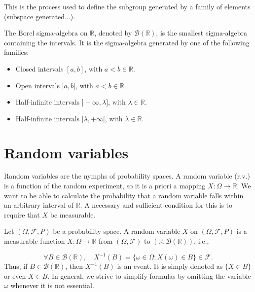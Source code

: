 \begin{remark}
This is the process used to define the subgroup generated by a family of elements (subspace generated...).
\end{remark}%
\begin{definition}
The Borel sigma-algebra on $\mathbb{R}$, denoted by $\mathcal{B}(\mathbb{R})$, is the smallest sigma-algebra containing the intervals. It is the sigma-algebra generated by one of the following families:
\begin{itemize}
    \item Closed intervals $[a, b]$, with $a < b \in \mathbb{R}$.
    \item Open intervals $]a, b[$, with $a < b \in \mathbb{R}$.
    \item Half-infinite intervals $]-\infty, \lambda]$, with $\lambda \in \mathbb{R}$.
    \item Half-infinite intervals $[\lambda, +\infty[$, with $\lambda \in \mathbb{R}$.
\end{itemize}
\end{definition}%
\section{Random variables}%

Random variables are the nymphs of probability spaces. A random variable (r.v.) is a function of the random experiment, so it is a priori a mapping $X : \Omega \to \mathbb{R}$. We want to be able to calculate the probability that a random variable falls within an arbitrary interval of $\mathbb{R}$. A necessary and sufficient condition for this is to require that $X$ be measurable.
\begin{definition}
Let $(\Omega, \mathcal{F}, P)$ be a probability space. A random variable $X$ on $(\Omega, \mathcal{F}, P)$ is a measurable function $X : \Omega \to \mathbb{R}$ from $(\Omega, \mathcal{F})$ to $(\mathbb{R}, \mathcal{B}(\mathbb{R}))$, i.e.,

\[ \forall B \in \mathcal{B}(\mathbb{R}), \quad X^{-1}(B) = \{\omega \in \Omega; X(\omega) \in B\} \in \mathcal{F}. \]
Thus, if $B \in \mathcal{B}(\mathbb{R})$, then $X^{-1}(B)$ is an event. It is simply denoted as $\{X \in B\}$ or even $X \in B$. In general, we strive to simplify formulas by omitting the variable $\omega$ whenever it is not essential.
\end{definition}%
